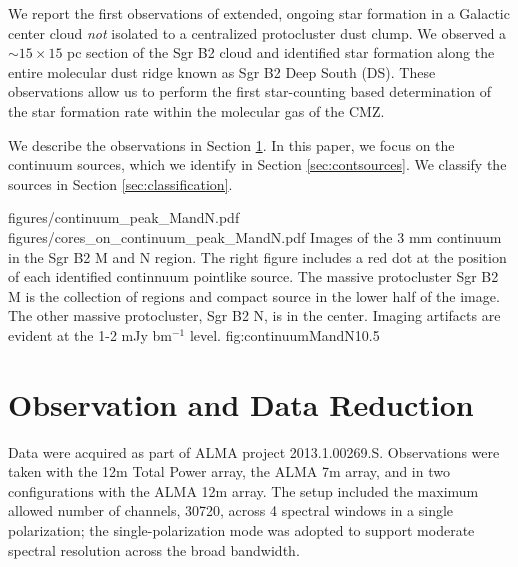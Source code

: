 \documentclass[twocolumn]{aastex61}
\begin{document}
We report the first observations of extended, ongoing star formation in a
Galactic center cloud \emph{not} isolated to a centralized protocluster dust
clump.  We observed a $\sim15\times15$ pc section of the Sgr B2 cloud and
identified star formation along the entire molecular dust ridge known as Sgr B2
Deep South (DS).  These observations allow us to perform the first
star-counting based determination of the star formation rate within the
molecular gas of the CMZ.

We describe the observations in Section \ref{sec:observations}. In this paper,
we focus on the continuum sources, which we identify in Section
\ref{sec:contsources}.  We classify the sources in Section
\ref{sec:classification}.  

\FigureTwo
{figures/continuum_peak_MandN.pdf}
{figures/cores_on_continuum_peak_MandN.pdf}
{Images of the 3 mm continuum in the Sgr B2 M and N region.  The right figure
includes a red dot at the position of each identified continnuum pointlike
source.  The massive protocluster Sgr B2 M is the collection of \hii regions
and compact source in the lower half of the image.  The other massive
protocluster, Sgr B2 N, is in the center.  Imaging artifacts are evident at the
1-2 mJy bm$^{-1}$ level.
}
{fig:continuumMandN}{1}{0.5\textwidth}

\section{Observation and Data Reduction}
\label{sec:observations}
Data were acquired as part of ALMA project 2013.1.00269.S.  Observations were
taken with the 12m Total Power array, the ALMA 7m array, and in two
configurations with the ALMA 12m array.  The setup included the maximum allowed
number of channels, 30720, across 4 spectral windows in a single polarization;
the single-polarization mode was adopted to support moderate spectral resolution
across the broad bandwidth.
\end{document}
